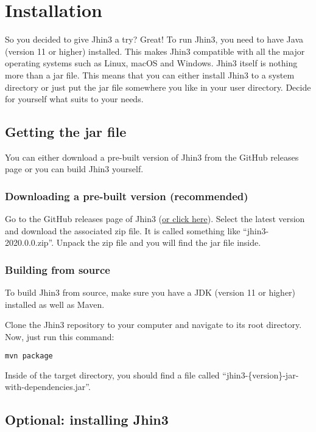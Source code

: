 \section{Installation}

So you decided to give Jhin3 a try? Great!
To run Jhin3, you need to have Java (version 11 or higher) installed. This makes Jhin3 compatible with all the major operating systems such as Linux, macOS and Windows. Jhin3 itself is nothing more than a jar file. This means that you can either install Jhin3 to a system directory or just put the jar file somewhere you like in your user directory. Decide for yourself what suits to your needs.

\subsection{Getting the jar file}

You can either download a pre-built version of Jhin3 from the GitHub releases page or you can build Jhin3 yourself.

\subsubsection{Downloading a pre-built version (recommended)}

Go to the GitHub releases page of Jhin3 (\href{https://github.com/hannesbraun/jhin3/releases}{or click here}). Select the latest version and download the associated zip file. It is called something like ``jhin3-2020.0.0.zip''.
Unpack the zip file and you will find the jar file inside.

\subsubsection{Building from source}

To build Jhin3 from source, make sure you have a JDK (version 11 or higher) installed as well as Maven.

Clone the Jhin3 repository to your computer and navigate to its root directory. Now, just run this command:
\begin{lstlisting}[language=bash]
mvn package
\end{lstlisting}

Inside of the target directory, you should find a file called ``jhin3-\{version\}-jar-with-dependencies.jar''.

\subsection{Optional: installing Jhin3}


